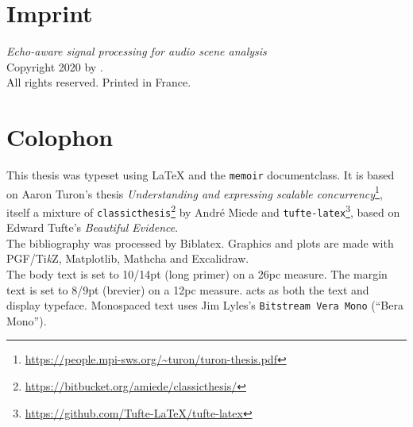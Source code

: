 \thispagestyle{empty}
\hphantom{.}
\vfill

\section*{Imprint}

\textit{Echo-aware signal processing for audio scene analysis}\\
Copyright \textcopyright{} 2020 by \theauthor{}.\\
All rights reserved. Printed in France.\\

\section*{Colophon}

This thesis was typeset using \LaTeX{} and the \texttt{memoir} documentclass.
It is based on Aaron Turon's thesis \emph{Understanding and expressing scalable concurrency}\footnote{\url{https://people.mpi-sws.org/~turon/turon-thesis.pdf}}, itself a mixture of \texttt{classicthesis}\footnote{\url{https://bitbucket.org/amiede/classicthesis/}} by Andr\'e Miede and \texttt{tufte-latex}\footnote{\url{https://github.com/Tufte-LaTeX/tufte-latex}},
 based on Edward Tufte's \emph{Beautiful Evidence}.\\[0.5\baselineskip]
%
The bibliography was processed by Biblatex.
Graphics and plots are made with PGF/Ti\emph{k}Z, Matplotlib, Mathcha and Excalidraw.\\[0.5\baselineskip]
%
The body text is set to 10/14pt (long primer) on a 26pc measure.
The margin text is set to 8/9pt (brevier) on a 12pc measure.
 acts as both the text and display typeface.
Monospaced text uses Jim Lyles's \texttt{Bitstream Vera Mono} (\enquote{Bera Mono}).

\clearpage{}


